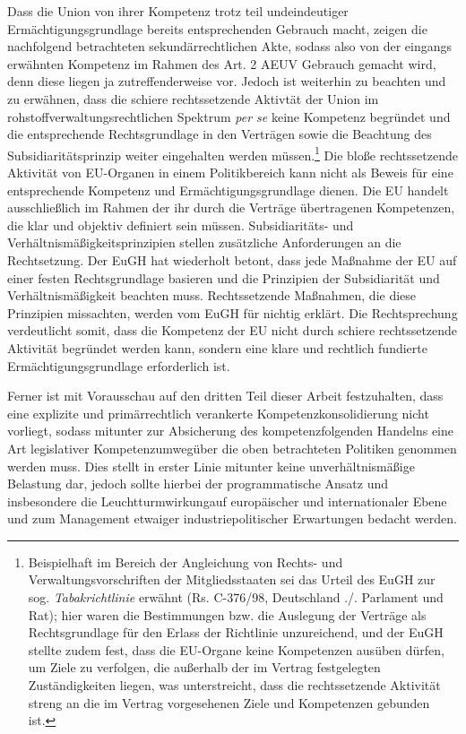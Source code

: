 \documentclass[12pt,a4paper,oneside]{book} %
\begin{document}
	Dass die Union von ihrer Kompetenz trotz teil undeindeutiger Ermächtigungsgrundlage bereits entsprechenden Gebrauch macht, zeigen die nachfolgend betrachteten sekundärrechtlichen Akte, sodass also von der eingangs erwähnten Kompetenz im Rahmen des Art. 2 AEUV Gebrauch gemacht wird, denn diese liegen ja zutreffenderweise vor. Jedoch ist weiterhin zu beachten und zu erwähnen, dass die schiere rechtssetzende Aktivtät der Union im rohstoffverwaltungsrechtlichen Spektrum \textit{per se} keine Kompetenz begründet und die entsprechende Rechtsgrundlage in den Verträgen sowie die Beachtung des Subsidiaritätsprinzip weiter eingehalten werden müssen.\footnote{Beispielhaft im Bereich der Angleichung von Rechts- und Verwaltungsvorschriften der Mitgliedsstaaten sei das Urteil des EuGH zur sog. \textit{Tabakrichtlinie} erwähnt (Rs. C-376/98, Deutschland ./. Parlament und Rat); hier waren die Bestimmungen bzw. die Auslegung der Verträge als Rechtsgrundlage für den Erlass der Richtlinie unzureichend, und der EuGH stellte zudem fest, dass die EU-Organe keine Kompetenzen ausüben dürfen, um Ziele zu verfolgen, die außerhalb der im Vertrag festgelegten Zuständigkeiten liegen, was unterstreicht, dass die rechtssetzende Aktivität streng an die im Vertrag vorgesehenen Ziele und Kompetenzen gebunden ist.} Die bloße rechtssetzende Aktivität von EU-Organen in einem Politikbereich kann nicht als Beweis für eine entsprechende Kompetenz und Ermächtigungsgrundlage dienen. Die EU handelt ausschließlich im Rahmen der ihr durch die Verträge übertragenen Kompetenzen, die klar und objektiv definiert sein müssen. Subsidiaritäts- und Verhältnismäßigkeitsprinzipien stellen zusätzliche Anforderungen an die Rechtsetzung. Der EuGH hat wiederholt betont, dass jede Maßnahme der EU auf einer festen Rechtsgrundlage basieren und die Prinzipien der Subsidiarität und Verhältnismäßigkeit beachten muss. Rechtssetzende Maßnahmen, die diese Prinzipien missachten, werden vom EuGH für nichtig erklärt. Die Rechtsprechung verdeutlicht somit, dass die Kompetenz der EU nicht durch schiere rechtssetzende Aktivität begründet werden kann, sondern eine klare und rechtlich fundierte Ermächtigungsgrundlage erforderlich ist.
	
	Ferner ist mit Vorausschau auf den dritten Teil dieser Arbeit festzuhalten, dass eine explizite und primärrechtlich verankerte Kompetenzkonsolidierung nicht vorliegt, sodass mitunter zur Absicherung des kompetenzfolgenden Handelns eine Art legislativer \glqq Kompetenzumweg\grqq über die oben betrachteten Politiken genommen werden muss. Dies stellt in erster Linie mitunter keine unverhältnismäßige Belastung dar, jedoch sollte hierbei der programmatische Ansatz und insbesondere die \glqq Leuchtturmwirkung\grqq auf europäischer und internationaler Ebene und zum Management etwaiger industriepolitischer Erwartungen bedacht werden.
	
\end{document}
